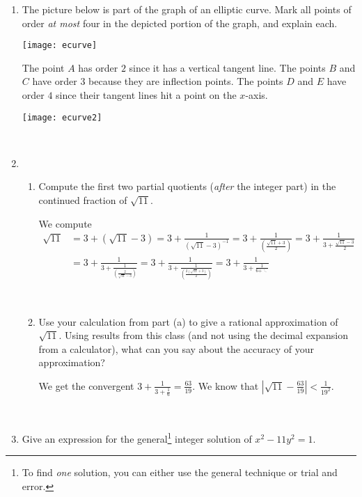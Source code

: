 \documentclass[12pt]{amsart}
\newcommand{\solution}[1]{\ifthenelse {\equal{\displaysol}{1}} {\begin{framed}{\color{meretale}\noindent #1}\end{framed}} { \ }}
\begin{document}
\begin{enumerate}
\begin{enumerate}
 \item The picture below is part of the graph of an elliptic curve. Mark all points of order \emph{at most} four in the depicted portion of the graph, and explain each.
\begin{center}
\texttt{[image: ecurve]} 
\end{center}
\solution{The point $A$ has order $2$ since it has a vertical tangent line. The points $B$ and $C$ have order $3$ because they are inflection points. The points $D$ and $E$ have order $4$ since their tangent lines hit a point on the $x$-axis.
\begin{center}
\texttt{[image: ecurve2]} 
\end{center}
}



\vfill


\newpage

\item \begin{enumerate}
\item Compute the first two partial quotients (\emph{after} the integer part) in the continued fraction of $\sqrt{11}$.
\solution{We compute
\[ \begin{aligned}
\sqrt{11} &= 3 + (\sqrt{11} - 3) = 3 + \frac{1}{(\sqrt{11} - 3)^{-1}} = 3 + \frac{1}{\left(\frac{\sqrt{11} + 3}{2}\right)} =  3 + \frac{1}{ 3+ \frac{\sqrt{11} - 3}{2}} \\
&= 3 + \frac{1}{ 3+ \frac{1} {\left( \frac{2}{\sqrt{11} - 3}\right)}} = 3 + \frac{1}{ 3+ \frac{1} {\left( \frac{2(\sqrt{11} +3)}{2}\right)}} = 3 + \frac{1}{ 3+ \frac{1} {6 + \ddots}} 
\end{aligned}\]
}
\vfill
\vfill

\item Use your calculation from part (a) to give a rational approximation of $\sqrt{11}$. Using results from this class (and not using the decimal expansion from a calculator), what can you say about the accuracy of your approximation?

\solution{We get the convergent $3 + \frac{1}{3+ \frac{1}{6}} = \frac{63}{19}$. We know that $|\sqrt{11} - \frac{63}{19}|< \frac{1}{19^2}$.
}
\vfill
\end{enumerate}


\newpage

\item Give an expression for the general\footnote{To find \textit{one} solution, you can either use the general technique or trial and error.} integer solution of $x^2 - 11y^2 = 1$.


\end{enumerate}
\end{enumerate}
\end{document}
